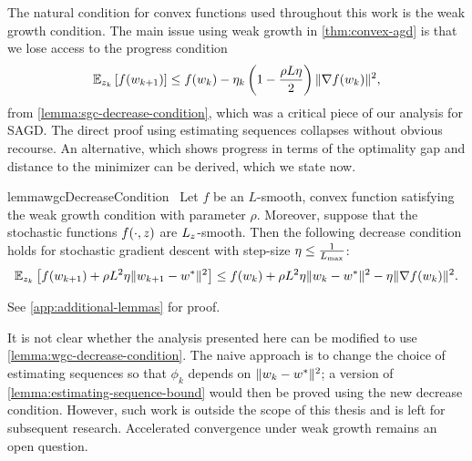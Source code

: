The natural condition for convex functions used throughout this work is the weak growth condition.
The main issue using weak growth in \autoref{thm:convex-agd} is that we lose access to the progress condition 
\[ \mathbb{E}_{z_{k}} \left[f(w_{k+1})\right] \leq f(w_k) - \eta_k \left(1 - \frac{\rho L \eta}{2}\right) \|\nabla f(w_k)\|^2, \]
from \autoref{lemma:sgc-decrease-condition}, which was a critical piece of our analysis for SAGD. 
The direct proof using estimating sequences collapses without obvious recourse.
An alternative, which shows progress in terms of the optimality gap and distance to the minimizer can be derived, which we state now.

 \begin{restatable}{lemma}{wgcDecreaseCondition}~\label{lemma:wgc-decrease-condition}
    Let \( f \) be an \( L \)-smooth, convex function satisfying the weak growth condition with parameter \( \rho \). 
    Moreover, suppose that the stochastic functions \( f(\cdot, z) \) are \( L_z \)-smooth.
    Then the following decrease condition holds for stochastic gradient descent with step-size \( \eta \leq \frac{1}{L_{\text{max}}} \):
    \[ \mathbb{E}_{z_{k}} \left[f(w_{k+1}) + \rho L^2 \eta \|w_{k+1} - w^*\|^2\right] \leq f(w_k) + \rho L^2 \eta \|w_k - w^*\|^2 - \eta \|\nabla f(w_k)\|^2. \]
\end{restatable}
\noindent See \autoref{app:additional-lemmas} for proof. \hfill \break

It is not clear whether the analysis presented here can be modified to use \autoref{lemma:wgc-decrease-condition}. 
The naive approach is to change the choice of estimating sequences so that \( \phi_k \)  depends on \( \|w_k - w^*\|^2 \); a version of \autoref{lemma:estimating-sequence-bound} would then be proved using the new decrease condition.
However, such work is outside the scope of this thesis and is left for subsequent research.
Accelerated convergence under weak growth remains an open question.


